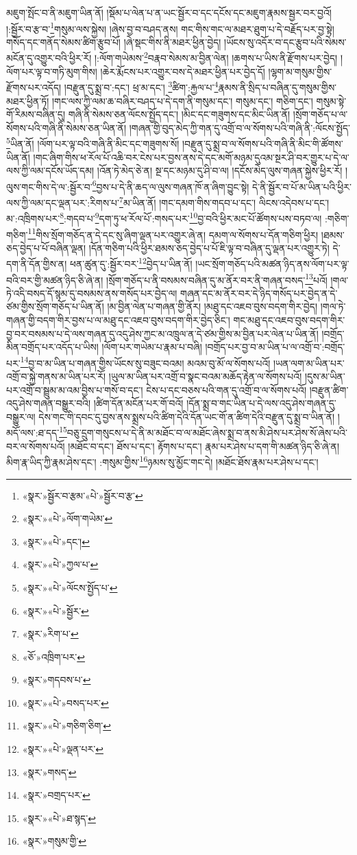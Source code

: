 མཇུག་སྤོང་བ་ནི་མཇུག་ཡིན་ནོ། །སྡོམ་པ་ལེན་པ་ན་ཡང་སྦྱོར་བ་དང་དངོས་དང་མཇུག་རྣམས་སྦྱར་བར་བྱའོ། །:སྦྱོར་བ་རྩ་བ་\footnote{«སྣར་»སྦྱོར་བ་རྩམ་«པེ་»སྦྱོར་བ་རྩ་}གསུམ་ལས་སྐྱེས། །ཞེས་བྱ་བ་བཤད་ནས། གང་གིས་གང་ལ་མཐར་ཐུག་པ་དེ་བརྗོད་པར་བྱ་སྟེ། གསོད་དང་གནོད་སེམས་ཚིག་རྩུབ་པོ། །ཞེ་སྡང་གིས་ནི་མཐར་ཕྱིན་བྱེད། །ཡོངས་སུ་འདོར་བ་དང་རྩུབ་པའི་སེམས་མངོན་དུ་འགྱུར་བའི་ཕྱིར་རོ། །:ལོག་གཡེམས་\footnote{«སྣར་»«པེ་»ལོག་གཡེམ་}བརྣབ་སེམས་མ་བྱིན་ལེན། །ཆགས་པ་ཡིས་ནི་རྫོགས་པར་བྱེད། །ལོག་པར་ལྟ་བ་གཏི་མུག་གིས། །ཆེར་རྨོངས་པར་འགྱུར་བས་དེ་མཐར་ཕྱིན་པར་བྱེད་དོ། །ལྷག་མ་གསུམ་གྱིས་རྫོགས་པར་འདོད། །བརྫུན་དུ་སྨྲ་བ་:དང་། ཕྲ་མ་དང་། \footnote{«སྣར་»«པེ་»དང་།  }ཚིག་:རྐྱལ་པ་\footnote{«སྣར་»«པེ་»ཀྱལ་པ་}རྣམས་ནི་སྲིད་པ་བཞིན་དུ་གསུམ་གྱིས་མཐར་ཕྱིན་ཏོ། །གང་ལས་ཀྱི་ལམ་ཆ་བཞིར་བཤད་པ་དེ་དག་ནི་གསུམ་དང་། གསུམ་དང་། གཅིག་དང་། གསུམ་སྟེ་གོ་རིམས་བཞིན་དུ། གཞི་ནི་སེམས་ཅན་ལོངས་སྤྱོད་དང་། །མིང་དང་གཟུགས་དང་མིང་ཡིན་ནོ། །སྲོག་གཅོད་པ་ལ་སོགས་པའི་གཞི་ནི་སེམས་ཅན་ཡིན་ནོ། །གཞན་གྱི་བུད་མེད་ཀྱི་གན་དུ་འགྲོ་བ་ལ་སོགས་པའི་གཞི་ནི་:ལོངས་སྤྱོད་\footnote{«སྣར་»«པེ་»ལོངས་སྤྱོད་པ་}ཡིན་ནོ། །ལོག་པར་ལྟ་བའི་གཞི་ནི་མིང་དང་གཟུགས་སོ། །བརྫུན་དུ་སྨྲ་བ་ལ་སོགས་པའི་གཞི་ནི་མིང་གི་ཚོགས་ཡིན་ནོ། །གང་ཞིག་གིས་ཕ་རོལ་པོ་འཆི་བར་ངེས་པར་བྱས་ནས་དེ་དང་མགོ་མཉམ་དུའམ་སྔར་ཤི་བར་གྱུར་པ་དེ་ལ་ལས་ཀྱི་ལམ་དངོས་ཡོད་དམ། །འོན་ཏེ་མེད་ཅེ་ན། སྔ་དང་མཉམ་དུ་ཤི་བ་ལ། །དངོས་མེད་ལུས་གཞན་སྐྱེས་ཕྱིར་རོ། །ལུས་གང་གིས་དེ་ལ་:སྦྱོར་བ་\footnote{«སྣར་»«པེ་»སྦྱོར་}བྱས་པ་དེ་ནི་ཆད་ལ་ལུས་གཞན་ཁོ་ན་ཞིག་བྱུང་སྟེ། དེ་ནི་སྦྱོར་བ་པོ་མ་ཡིན་པའི་ཕྱིར་ལས་ཀྱི་ལམ་དང་ལྡན་པར་:རིགས་པ་\footnote{«སྣར་»རིག་པ་}མ་ཡིན་ནོ། །གང་དམག་གིས་གདབ་པ་དང་། ལིངས་འདེབས་པ་དང་། མ་:འཁྲིགས་པར་\footnote{«ཅོ་»འཁྲིག་པར་}:གདབ་པ་\footnote{«སྣར་»གདབས་པ་}དག་ཏུ་ཕ་རོལ་པོ་:གསད་པར་\footnote{«སྣར་»«པེ་»བསད་པར་}བྱ་བའི་ཕྱིར་མང་པོ་ཚོགས་པས་བཏབ་ལ། :གཅིག་གཅིག་\footnote{«སྣར་»«པེ་»གཅིག་ཅིག་}གིས་སྲོག་གཅོད་ན་དེ་དང་སུ་ཞིག་ལྡན་པར་འགྱུར་ཞེ་ན། དམག་ལ་སོགས་པ་དོན་གཅིག་ཕྱིར། །ཐམས་ཅད་བྱེད་པ་པོ་བཞིན་ལྡན། །དོན་གཅིག་པའི་ཕྱིར་ཐམས་ཅད་བྱེད་པ་པོ་ཇི་ལྟ་བ་བཞིན་དུ་ལྡན་པར་འགྱུར་ཏེ། དེ་དག་ནི་དོན་གྱིས་ན། ཕན་ཚུན་དུ་:སྦྱོར་བར་\footnote{«སྣར་»«པེ་»ལྡན་པར་}བྱེད་པ་ཡིན་ནོ། །ཡང་སྲོག་གཅོད་པའི་མཚན་ཉིད་ནས་ལོག་པར་ལྟ་བའི་བར་གྱི་མཚན་ཉིད་ཅི་ཞེ་ན། །སྲོག་གཅོད་པ་ནི་བསམས་བཞིན་དུ་མ་ནོར་བར་ནི་གཞན་བསད་\footnote{«སྣར་»གསད་}པའོ། །གལ་ཏེ་འདི་བསད་དོ་སྙམ་དུ་བསམས་ནས་གསོད་པར་བྱེད་ལ། གཞན་དང་མ་ནོར་བར་དེ་ཉིད་གསོད་པར་བྱེད་ན་དེ་ཙམ་གྱིས་སྲོག་གཅོད་པ་ཡིན་ནོ། །མ་བྱིན་ལེན་པ་གཞན་གྱི་ནོར། །མཐུ་དང་འཇབ་བུས་བདག་གིར་བྱེད། །གལ་ཏེ་གཞན་གྱི་བདག་གིར་བྱས་པ་ལ་མཐུ་དང་འཇབ་བུས་བདག་གིར་བྱེད་ཅིང་། གང་མཐུ་དང་འཇབ་བུས་བདག་གིར་བྱ་བར་བསམས་པ་དེ་ལས་གཞན་དུ་འདུ་ཤེས་ཀྱང་མ་འཁྲུལ་ན་དེ་ཙམ་གྱིས་མ་བྱིན་པར་ལེན་པ་ཡིན་ནོ། །བགྲོད་མིན་བགྲོད་པར་འདོད་པ་ཡིས། །ལོག་པར་གཡེམ་པ་རྣམ་པ་བཞི། །བགྲོད་པར་བྱ་བ་མ་ཡིན་པ་ལ་འགྲོ་བ་:བགྲོད་པར་\footnote{«སྣར་»བགྲད་པར་}བྱ་བ་མ་ཡིན་པ་གཞན་གྱིས་ཡོངས་སུ་བཟུང་བའམ། མའམ་བུ་མོ་ལ་སོགས་པའོ། །ཡན་ལག་མ་ཡིན་པར་འགྲོ་བ་སྐྱེ་གནས་མ་ཡིན་པར་རོ། །ཡུལ་མ་ཡིན་པར་འགྲོ་བ་སྣང་བའམ་མཆོད་རྟེན་ལ་སོགས་པའོ། །དུས་མ་ཡིན་པར་འགྲོ་བ་སྦྲུམ་མ་འམ་བྱིས་པ་གསོ་བ་དང་། ངེས་པ་དང་བཅས་པའི་གན་དུ་འགྲོ་བ་ལ་སོགས་པའོ། །བརྫུན་ཚིག་འདུ་ཤེས་གཞན་བསྒྱུར་བའི། །ཚིག་དོན་མངོན་པར་གོ་བའོ། །དོན་སྨྲ་བ་གང་ཡིན་པ་དེ་ལས་འདུ་ཤེས་གཞན་དུ་བསྒྱུར་ལ། དེས་གང་གི་དབང་དུ་བྱས་ནས་སྨྲས་པའི་ཚིག་དེའི་དོན་ཡང་གོ་ན་ཚིག་དེའི་བརྫུན་དུ་སྨྲ་བ་ཡིན་ནོ། །མདོ་ལས་:ཐ་དད་\footnote{«སྣར་»«པེ་»ཐ་སྙད་}བཅུ་དྲུག་གསུངས་པ་དེ་ནི་མ་མཐོང་བ་ལ་མཐོང་ཞེས་སྨྲ་བ་ནས་མི་ཤེས་པར་ཤེས་སོ་ཞེས་པའི་བར་ལ་སོགས་པའོ། །མཐོང་བ་དང་། ཐོས་པ་དང་། རྟོགས་པ་དང་། རྣམ་པར་ཤེས་པ་དག་གི་མཚན་ཉིད་ཅི་ཞེ་ན། མིག་རྣ་ཡིད་ཀྱི་རྣམ་ཤེས་དང་། :གསུམ་གྱིས་\footnote{«སྣར་»གསུམ་གྱི་}ཉམས་སུ་མྱོང་གང་དེ། །མཐོང་ཐོས་རྣམ་པར་ཤེས་པ་དང་། 